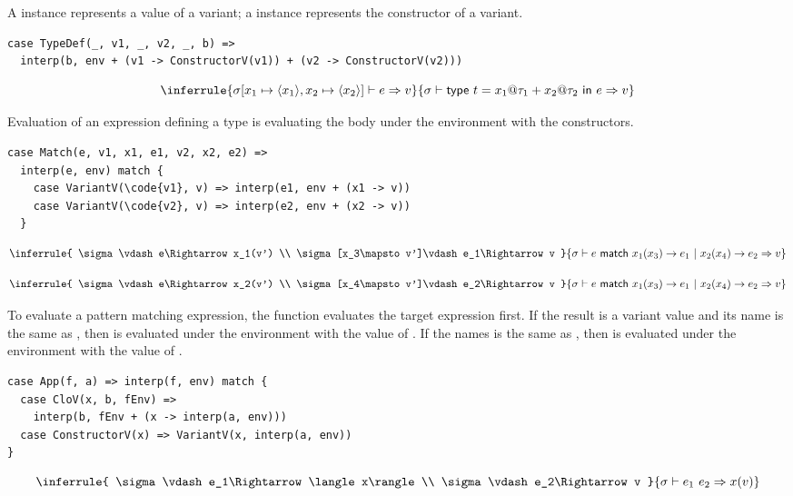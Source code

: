 A  instance represents a value of a variant; a 
instance
represents the constructor of a variant.

\begin{verbatim}
case TypeDef(_, v1, _, v2, _, b) =>
  interp(b, env + (v1 -> ConstructorV(v1)) + (v2 -> ConstructorV(v2)))
\end{verbatim}

\[
\inferrule
{ \sigma[x_1\mapsto \langle x_1\rangle,x_2\mapsto \langle x_2\rangle]\vdash
e\Rightarrow v }
{ \sigma\vdash \textsf{type}\ t=x_1@\tau_1+x_2@\tau_2\ \textsf{in}\ e\Rightarrow
v }
\]

Evaluation of an expression defining a type is evaluating the body under the
environment with the constructors.

\begin{verbatim}
case Match(e, v1, x1, e1, v2, x2, e2) =>
  interp(e, env) match {
    case VariantV(\code{v1}, v) => interp(e1, env + (x1 -> v))
    case VariantV(\code{v2}, v) => interp(e2, env + (x2 -> v))
  }
\end{verbatim}

\[
\inferrule
{ \sigma\vdash e\Rightarrow x_1(v') \\
  \sigma[x_3\mapsto v']\vdash e_1\Rightarrow v }
{ \sigma\vdash e\ \textsf{match}\ x_1(x_3)\rightarrow e_1\ |\ x_2(x_4)\rightarrow
e_2\Rightarrow v }
\]

\[
\inferrule
{ \sigma\vdash e\Rightarrow x_2(v') \\
  \sigma[x_4\mapsto v']\vdash e_2\Rightarrow v }
{ \sigma\vdash e\ \textsf{match}\ x_1(x_3)\rightarrow e_1\ |\ x_2(x_4)\rightarrow
e_2\Rightarrow v }
\]

To evaluate a pattern matching expression, the function evaluates the target
expression first. If the result is a variant value and its name is the same as
, then  is evaluated under the environment with the value of
. If
the names is the same as , then  is evaluated under the
environment with
the value of .

\begin{verbatim}
case App(f, a) => interp(f, env) match {
  case CloV(x, b, fEnv) =>
    interp(b, fEnv + (x -> interp(a, env)))
  case ConstructorV(x) => VariantV(x, interp(a, env))
}
\end{verbatim}

\[
\inferrule
{ \sigma\vdash e_1\Rightarrow \langle x\rangle \\
  \sigma\vdash e_2\Rightarrow v }
{ \sigma\vdash e_1\ e_2\Rightarrow x(v) }
\]

